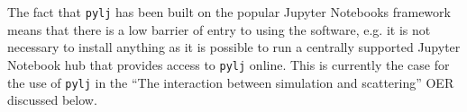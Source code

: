 The fact that \texttt{pylj} has been built on the popular Jupyter Notebooks framework means that there is a low barrier of entry to using the software, e.g. it is not necessary to install anything as it is possible to run a centrally supported Jupyter Notebook hub that provides access to \texttt{pylj} online.
This is currently the case for the use of \texttt{pylj} in the ``The interaction between simulation and scattering'' OER discussed below.
